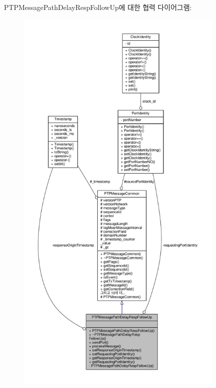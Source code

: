 P\+T\+P\+Message\+Path\+Delay\+Resp\+Follow\+Up에 대한 협력 다이어그램\+:
\nopagebreak
\begin{figure}[H]
\begin{center}
\leavevmode
\includegraphics[height=550pt]{class_p_t_p_message_path_delay_resp_follow_up__coll__graph}
\end{center}
\end{figure}
